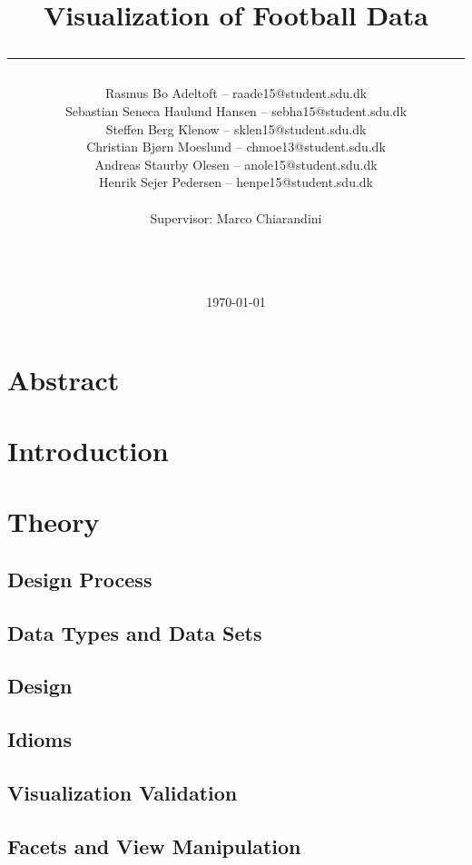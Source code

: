 \documentclass[a4paper,11pt]{article}
\title{Visualization of Football Data\\\rule{10cm}{0.5mm}}
\author{Rasmus Bo Adeltoft -- raade15@student.sdu.dk\\Sebastian Seneca Haulund Hansen -- sebha15@student.sdu.dk\\Steffen Berg Klenow -- sklen15@student.sdu.dk\\Christian Bjørn Moeslund -- chmoe13@student.sdu.dk\\Andreas Staurby Olesen -- anole15@student.sdu.dk\\Henrik Sejer Pedersen -- henpe15@student.sdu.dk
\\\\Supervisor: Marco Chiarandini\\\rule{5.5cm}{0.5mm}\\}
\date{\today}
\begin{document}
\maketitle
\newpage
\section*{Abstract}


\newpage
\tableofcontents
\newpage
\section{Introduction}


\section{Theory} %

\subsection{Design Process} %


\subsection{Data Types and Data Sets} %


\subsection{Design} %


\subsection{Idioms} %


\subsection{Visualization Validation} %

\subsection{Facets and View Manipulation} %

\end{document}

